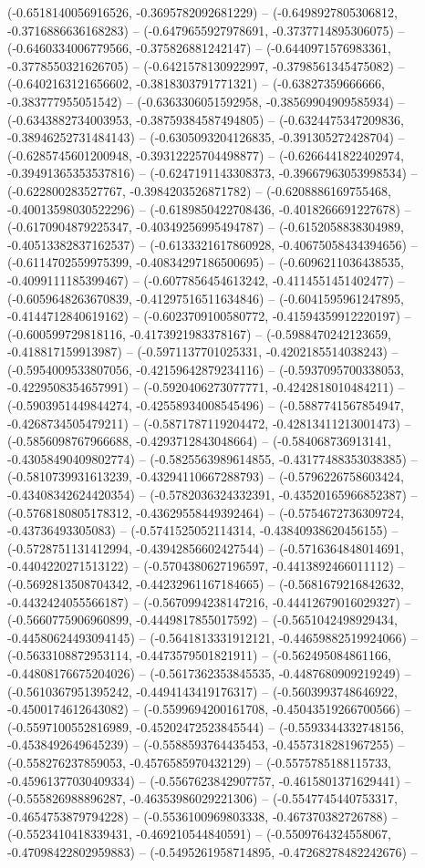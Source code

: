 (-0.6518140056916526, -0.3695782092681229) -- (-0.6498927805306812, -0.3716886636168283) -- (-0.6479655927978691, -0.3737714895306075) -- (-0.6460334006779566, -0.375826881242147) -- (-0.6440971576983361, -0.3778550321626705) -- (-0.6421578130922997, -0.3798561345475082) -- (-0.6402163121656602, -0.3818303791771321) -- (-0.63827359666666, -0.383777955051542) -- (-0.6363306051592958, -0.38569904909585934) -- (-0.6343882734003953, -0.38759384587494805) -- (-0.6324475347209836, -0.38946252731484143) -- (-0.6305093204126835, -0.391305272428704) -- (-0.6285745601200948, -0.39312225704498877) -- (-0.6266441822402974, -0.39491365353537816) -- (-0.6247191143308373, -0.39667963053998534) -- (-0.622800283527767, -0.3984203526871782) -- (-0.6208886169755468, -0.40013598030522296) -- (-0.6189850422708436, -0.4018266691227678) -- (-0.6170904879225347, -0.40349256995494787) -- (-0.6152058838304989, -0.40513382837162537) -- (-0.6133321617860928, -0.40675058434394656) -- (-0.6114702559975399, -0.40834297186500695) -- (-0.6096211036438535, -0.4099111185399467) -- (-0.6077856454613242, -0.4114551451402477) -- (-0.6059648263670839, -0.41297516511634846) -- (-0.6041595961247895, -0.4144712840619162) -- (-0.6023709100580772, -0.41594359912220197) -- (-0.600599729818116, -0.4173921983378167) -- (-0.5988470242123659, -0.418817159913987) -- (-0.5971137701025331, -0.4202185514038243) -- (-0.5954009533807056, -0.42159642879234116) -- (-0.5937095700338053, -0.4229508354657991) -- (-0.5920406273077771, -0.4242818010484211) -- (-0.5903951449844274, -0.42558934008545496) -- (-0.5887741567854947, -0.4268734505479211) -- (-0.5871787119204472, -0.42813411213001473) -- (-0.5856098767966688, -0.4293712843048664) -- (-0.584068736913141, -0.43058490409802774) -- (-0.5825563989614855, -0.43177488353038385) -- (-0.5810739931613239, -0.43294110667288793) -- (-0.5796226758603424, -0.43408342624420354) -- (-0.5782036324332391, -0.43520165966852387) -- (-0.5768180805178312, -0.43629558449392464) -- (-0.5754672736309724, -0.43736493305083) -- (-0.5741525052114314, -0.43840938620456155) -- (-0.5728751131412994, -0.43942856602427544) -- (-0.5716364848014691, -0.4404220271513122) -- (-0.5704380627196597, -0.4413892466011112) -- (-0.5692813508704342, -0.44232961167184665) -- (-0.5681679216842632, -0.4432424055566187) -- (-0.5670994238147216, -0.44412679016029327) -- (-0.5660775906960899, -0.4449817855017592) -- (-0.5651042498929434, -0.44580624493094145) -- (-0.5641813331912121, -0.44659882519924066) -- (-0.5633108872953114, -0.4473579501821911) -- (-0.562495084861166, -0.44808176675204026) -- (-0.5617362353845535, -0.4487680909219249) -- (-0.5610367951395242, -0.4494143419176317) -- (-0.5603993748646922, -0.4500174612643082) -- (-0.5599694200161708, -0.45043519266700566) -- (-0.5597100552816989, -0.45202472523845544) -- (-0.5593344332748156, -0.4538492649645239) -- (-0.5588593764435453, -0.4557318281967255) -- (-0.558276237859053, -0.4576585970432129) -- (-0.5575785188115733, -0.45961377030409334) -- (-0.5567623842907757, -0.4615801371629441) -- (-0.555826988896287, -0.46353986029221306) -- (-0.5547745440753317, -0.4654753879794228) -- (-0.5536100969803338, -0.467370382726788) -- (-0.5523410418339431, -0.469210544840591) -- (-0.5509764324558067, -0.47098422802959883) -- (-0.5495261958714895, -0.47268278482242676) -- 